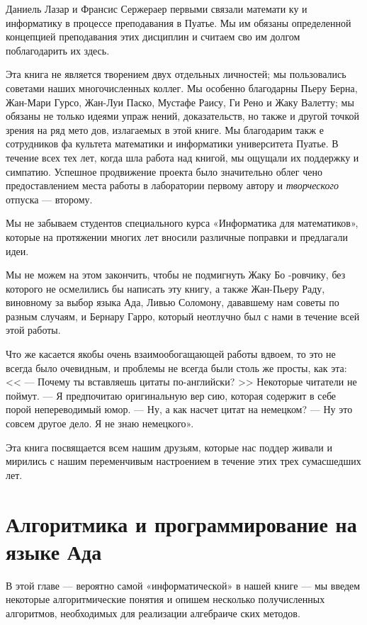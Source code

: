 	Даниель  Лазар  и  Франсис  Сержераер  первыми  связали математи­
	ку и информатику в процессе преподавания в Пуатье. Мы им обязаны 
	определенной концепцией преподавания этих дисциплин и считаем сво­
	им долгом поблагодарить их здесь.	
	
	\pagebreak
	Эта книга не является творением двух отдельных личностей; мы 
	пользовались советами  наших  многочисленных  коллег.  Мы  особенно 
	благодарны Пьеру Берна, Жан-Мари Гурсо, Жан-Луи Паско, Мустафе 
	Раису, Ги Рено и Жаку Валетту; мы обязаны не только идеями упраж­
	нений, доказательств, но также и другой точкой зрения на ряд мето­
	дов,  излагаемых  в этой  книге.  Мы  благодарим такж е сотрудников фа­
	культета математики  и  информатики университета Пуатье.  В течение 
	всех тех лет,  когда шла работа над  книгой, мы ощущали их поддержку 
	и  симпатию.  Успешное  продвижение  проекта  было значительно облег­
	чено  предоставлением  места  работы  в  лаборатории  первому  автору и 
	\textit{творческого} отпуска —  второму.
	
	Мы  не  забываем  студентов  специального  курса  «Информатика для 
	математиков»,  которые  на протяжении  многих лет  вносили  различные 
	поправки  и  предлагали  идеи.
	
	Мы  не  можем  на  этом закончить,  чтобы  не  подмигнуть Жаку Бо 
	-ровчику,  без  которого  не  осмелились  бы  написать  эту  книгу,  а также 
	Жан-Пьеру  Раду,  виновному  за   выбор  языка  Ада,  Ливью  Соломону, 
	дававшему  нам  советы  по  разным  случаям,  и  Бернару  Гарро,  который 
	неотлучно  был  с  нами  в течение  всей  этой  работы.
	
	Что же  касается  якобы очень  взаимообогащающей  работы  вдвоем, 
	то это не всегда было очевидным, и проблемы не всегда были столь 
	же просты, как эта: << — Почему ты  вставляешь цитаты  по-английски? >>
	Некоторые  читатели  не  поймут.  — Я  предпочитаю  оригинальную  вер­
	сию, которая содержит в себе порой непереводимый  юмор. — Ну, а как 
	насчет цитат на немецком?  —  Ну это совсем другое дело. Я не знаю 
	немецкого».
	
	Эта  книга посвящается всем нашим друзьям, которые нас поддер­
	живали и мирились с нашим переменчивым настроением в течение этих 
	трех сумасшедших лет.
	\chapter{Алгоритмика и \newline программирование на \newline языке Ада}
	\noindent В этой главе — вероятно самой «информатической» в нашей книге —
	мы введем некоторые алгоритмические понятия и опишем несколько
	получисленных алгоритмов, необходимых для реализации алгебраиче­
	ских методов.
	
